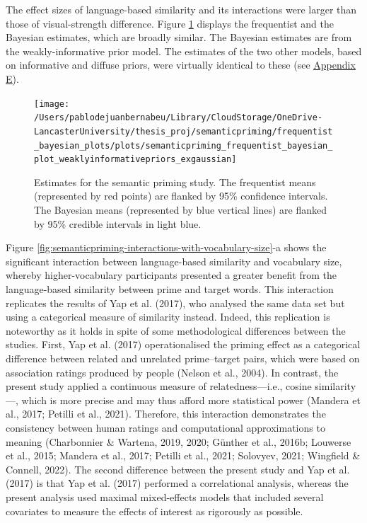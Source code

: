 \documentclass[
  12pt,
  man,floatsintext]{apa7}
\begin{document}
The effect sizes of language-based similarity and its interactions were larger than those of visual-strength difference. Figure \ref{fig:semanticpriming-frequentist-bayesian-plot-weaklyinformativepriors-exgaussian} displays the frequentist and the Bayesian estimates, which are broadly similar. The Bayesian estimates are from the weakly-informative prior model. The estimates of the two other models, based on informative and diffuse priors, were virtually identical to these (see \protect\hyperlink{appendix-E-Bayesian-analysis-results}{\underline{Appendix E}}).

\FloatBarrier

\begin{figure}

{\centering \texttt{[image: /Users/pablodejuanbernabeu/Library/CloudStorage/OneDrive-LancasterUniversity/thesis\_proj/semanticpriming/frequentist\_bayesian\_plots/plots/semanticpriming\_frequentist\_bayesian\_plot\_weaklyinformativepriors\_exgaussian]} 

}

\caption{Estimates for the semantic priming study. The frequentist means (represented by red points) are flanked by 95\% confidence intervals. The Bayesian means (represented by blue vertical lines) are flanked by 95\% credible intervals in light blue.}\label{fig:semanticpriming-frequentist-bayesian-plot-weaklyinformativepriors-exgaussian}
\end{figure}

Figure \ref{fig:semanticpriming-interactions-with-vocabulary-size}-a shows the significant interaction between language-based similarity and vocabulary size, whereby higher-vocabulary participants presented a greater benefit from the language-based similarity between prime and target words. This interaction replicates the results of Yap et al. (2017), who analysed the same data set but using a categorical measure of similarity instead. Indeed, this replication is noteworthy as it holds in spite of some methodological differences between the studies. First, Yap et al. (2017) operationalised the priming effect as a categorical difference between related and unrelated prime--target pairs, which were based on association ratings produced by people (Nelson et al., 2004). In contrast, the present study applied a continuous measure of relatedness---i.e., cosine similarity---, which is more precise and may thus afford more statistical power (Mandera et al., 2017; Petilli et al., 2021). Therefore, this interaction demonstrates the consistency between human ratings and computational approximations to meaning (Charbonnier \& Wartena, 2019, 2020; Günther et al., 2016b; Louwerse et al., 2015; Mandera et al., 2017; Petilli et al., 2021; Solovyev, 2021; Wingfield \& Connell, 2022). The second difference between the present study and Yap et al. (2017) is that Yap et al. (2017) performed a correlational analysis, whereas the present analysis used maximal mixed-effects models that included several covariates to measure the effects of interest as rigorously as possible.
\end{document}

